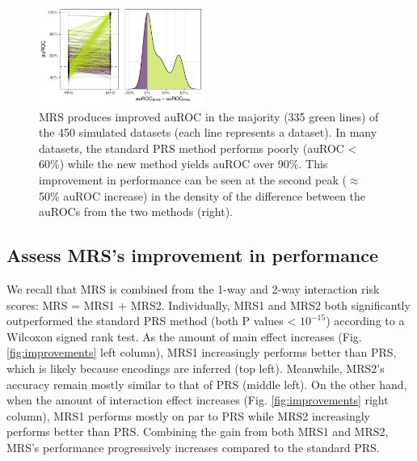\documentclass[a4paper,twoside, 9pt]{article}
\begin{document}
\begin{figure}
\centering
\includegraphics[width=0.48\textwidth]{images/1_ori_vs_MRS_auROC_.pdf}
\caption{MRS produces improved auROC in the majority (335 green lines)
of the 450 simulated datasets (each line represents a dataset). In many
datasets, the standard PRS method performs poorly (auROC \textless{}
60\%) while the new method yields auROC over 90\%. This improvement in
performance can be seen at the second peak ($\approx$ 50\% auROC
increase) in the density of the difference between the auROCs from the
two methods (right).}
\label{fig:auroc_mrs_prs}
\end{figure}

\hypertarget{assess-improvement-in-performance}{%
\subsection{Assess MRS's improvement in
performance}\label{assess-improvement-in-performance}}

\noindent We recall that MRS is combined from the 1-way and 2-way interaction risk scores: MRS = MRS1 + MRS2.
Individually, MRS1 and MRS2 both significantly outperformed the standard
PRS method (both P values \textless{} \(10^{-15}\)) according to a
Wilcoxon signed rank test. As the amount of main effect increases (Fig.
\ref{fig:improvements} left column), MRS1 increasingly performs better
than PRS, which is likely because encodings are inferred (top left).
Meanwhile, MRS2's accuracy remain mostly similar to that of PRS (middle
left). On the other hand, when the amount of interaction effect
increases (Fig. \ref{fig:improvements} right column), MRS1 performs
mostly on par to PRS while MRS2 increasingly performs better than PRS.
Combining the gain from both MRS1 and MRS2, MRS's performance
progressively increases compared to the standard PRS.
\end{document}
